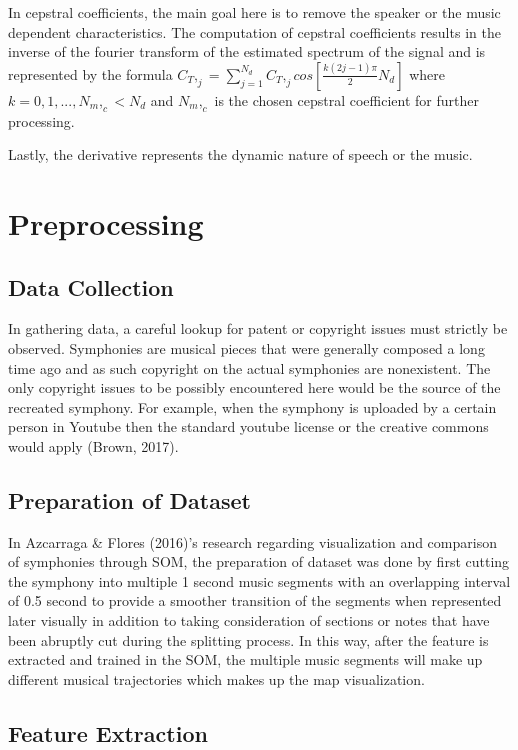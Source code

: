 In cepstral coefficients, the main goal here is to remove the speaker or the music dependent characteristics. The computation of cepstral coefficients results in the inverse of the fourier transform of the estimated spectrum of the signal and is represented by the formula $C_T,_j=\sum_{j=1}^{N_d} C_T,_j cos[\frac{k(2j-1)\pi}2N_d]$ where $k=0,1,...,N_m,_c<N_d$ and $N_m,_c$ is the chosen cepstral coefficient for further processing.

Lastly, the derivative represents the dynamic nature of speech or the music.

\section{Preprocessing}
\subsection{Data Collection}

In gathering data, a careful lookup for patent or copyright issues must strictly be observed. Symphonies are musical pieces that were generally composed a long time ago and as such copyright on the actual symphonies are nonexistent. The only copyright issues to be possibly encountered here would be the source of the recreated symphony. For example, when the symphony is uploaded by a certain person in Youtube then the standard youtube license or the creative commons would apply (Brown,  2017).

\subsection{Preparation of Dataset}

In Azcarraga \& Flores (2016)'s research regarding visualization and comparison of symphonies through SOM, the preparation of dataset was done by first cutting the symphony into multiple 1 second music segments with an overlapping interval of 0.5 second to provide a smoother transition of the segments when represented later visually in addition to taking consideration of sections or notes that have been abruptly cut during the splitting process. In this way, after the feature is extracted and trained in the SOM, the multiple music segments will make up different musical trajectories which makes up the map visualization.

\subsection{Feature Extraction}

